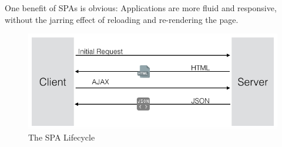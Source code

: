One benefit of SPAs is obvious: Applications are more fluid and responsive, without the jarring effect of reloading and re-rendering the page.
\begin{figure}[htb]
 \centering
 \includegraphics[width=1.0\linewidth]{images/chapter4/spa_life.png}\hfill
 \caption[SPA Lifecycle]{The SPA Lifecycle}
 \label{fig:spa_lifecycle}
\end{figure}
